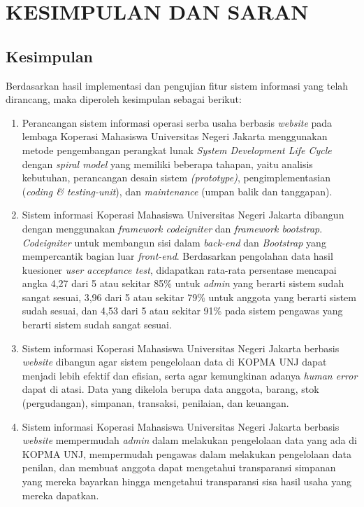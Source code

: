 
\chapter{KESIMPULAN DAN SARAN}

\section{Kesimpulan}
Berdasarkan hasil implementasi dan pengujian fitur sistem informasi yang telah dirancang, maka diperoleh kesimpulan sebagai berikut:

\begin{enumerate}
	\item Perancangan sistem informasi operasi serba usaha berbasis \emph{website} pada lembaga Koperasi Mahasiswa Universitas Negeri Jakarta menggunakan metode pengembangan perangkat lunak \textit{System Development Life Cycle} dengan \textit{spiral model} yang memiliki beberapa tahapan, yaitu analisis kebutuhan, perancangan desain sistem \textit{(prototype)}, pengimplementasian (\textit{coding \& testing-unit}), dan \textit{maintenance} (umpan balik dan tanggapan).
	
	\item Sistem informasi Koperasi Mahasiswa Universitas Negeri Jakarta dibangun dengan menggunakan \textit{framework codeigniter} dan \textit{framework bootstrap}. \textit{Codeigniter} untuk membangun sisi dalam \textit{back-end} dan \textit{Bootstrap} yang mempercantik bagian luar \textit{front-end}. Berdasarkan pengolahan data hasil kuesioner \textit{user acceptance test}, didapatkan rata-rata persentase mencapai angka 4,27 dari 5 atau sekitar 85\% untuk \textit{admin} yang berarti sistem sudah sangat sesuai, 3,96 dari 5 atau sekitar 79\% untuk anggota yang berarti sistem sudah sesuai, dan 4,53 dari 5 atau sekitar 91\% pada sistem pengawas yang berarti sistem sudah sangat sesuai.
	
	\item Sistem informasi Koperasi Mahasiswa Universitas Negeri Jakarta berbasis \textit{website} dibangun agar sistem pengelolaan data di KOPMA UNJ dapat menjadi lebih efektif dan efisian, serta agar kemungkinan adanya \textit{human error} dapat di atasi. Data yang dikelola berupa data anggota, barang, stok (pergudangan), simpanan, transaksi, penilaian, dan keuangan.
	
	\item Sistem informasi Koperasi Mahasiswa Universitas Negeri Jakarta berbasis \textit{website} mempermudah \textit{admin} dalam melakukan pengelolaan data yang ada di KOPMA UNJ, mempermudah pengawas dalam melakukan pengelolaan data penilan, dan membuat anggota dapat mengetahui transparansi simpanan yang mereka bayarkan hingga mengetahui transparansi sisa hasil usaha yang mereka dapatkan.
\end{enumerate}

